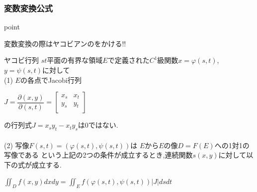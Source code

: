 \documentclass[a4paper]{jsarticle}
\begin{document}
\subsubsection{変数変換公式}
\begin{itembox}[l]{point}
    \begin{center}
        変数変換の際はヤコビアンのをかける!!
    \end{center}
\end{itembox}
\begin{itembox}[l]{ヤコビ行列}
    $st$平面の有界な領域$E$で定義された$C^1$級関数$x=\varphi\left(s,t\right)$,$y=\psi\left(s,t\right)$に対して\\
    (1) $E$の各点でJacobi行列
    \begin{center}
        $J=\dfrac{\partial\left(x,y\right)}{\partial\left(s,t\right)}=
            \begin{bmatrix}
                x_s & x_t \\
                y_s & y_t \\
            \end{bmatrix}
        $
    \end{center}
    の行列式$J=x_sy_t-x_ty_s$は$0$ではない.\\\\
    (2) 写像$F\left(s,t\right)=\left(\varphi\left(s,t\right),\psi\left(s,t\right)\right)$は
    $E$から$E$の像$D=F\left(E\right)$への1対1の写像である
    という上記の2つの条件が成立するとき,連続関数$s\left(x,y\right)$に対して以下の式が成立する.\\
    \begin{center}
        $\displaystyle\iint_Df\left(x,y\right)dxdy=\iint_Ef\left(\varphi\left(s,t\right),\psi\left(s,t\right)\right)|J|dsdt$
    \end{center}
\end{itembox}
\end{document}
